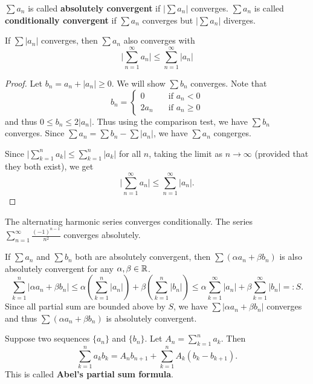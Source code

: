 \documentclass[a4paper]{ctexart}
\begin{document}
    \begin{mydef}
        $\sum a_n$ is called \textbf{absolutely convergent} if $\big|\sum a_n\big|$ converges. $\sum a_n$ is called \textbf{conditionally convergent} if $\sum a_n$ converges but  $\big|\sum a_n\big|$ diverges.
    \end{mydef}
    \begin{mythm}
        If $\sum |a_n|$ converges, then $\sum a_n$ also converges with
        \[
        \Big|\sum_{n=1}^\infty a_n\Big| \le \sum_{n=1}^\infty |a_n|
        \]
    \end{mythm}
    \begin{proof}
        Let $b_n = a_n + |a_n| \ge 0$. We will show $\sum b_n$ converges. Note that
        \[
        b_n = \begin{cases}
            0 \quad & \text{if } a_n < 0\\
            2a_n \quad & \text{if } a_n \ge 0
        \end{cases}
        \]
        and thus $0\le b_n \le 2|a_n|$. Thus using the comparison test, we have $\sum b_n$ converges. Since $\sum a_n = \sum b_n - \sum |a_n|$, we have $\sum a_n$ congerges.

        Since $\displaystyle \Big|\sum_{k=1}^n a_k \Big| \le \sum_{k=1}^n |a_k|$ for all $n$, taking the limit as $n \to \infty$ (provided that they both exist), we get
        \[
        \Big|\sum_{n=1}^\infty a_n\Big| \le \sum_{n=1}^\infty |a_n|.
        \]
    \end{proof}
    \begin{myex}
        The alternating harmonic series converges conditionally. The series $\displaystyle \sum_{n=1}^\infty  \frac{(-1)^{n-1}}{n^2}$ converges absolutely.
    \end{myex}
    \begin{mypro}
        If $\sum a_n$ and $\sum b_n$ both are absolutely convergent, then $\sum (\alpha a_n + \beta b_n)$ is also absolutely convergent for any $\alpha,\beta \in \mathbb{R}$.
        $$ \sum_{k=1}^n|\alpha a_n + \beta b_n| \le \alpha \left( \sum_{k=1}^n |a_n| \right) + \beta \left( \sum_{k=1}^n |b_n| \right) \le \alpha \sum_{k=1}^{\infty} |a_n| + \beta \sum_{k=1}^\infty |b_n| =: S.$$
        Since all partial sum are bounded above by $S$, we have $\sum |\alpha a_n + \beta b_n|$ converges and thus $\sum (\alpha a_n + \beta b_n)$ is absolutely convergent.
    \end{mypro}
    \begin{mylma}
        Suppose two sequences $\{a_n\}$ and $\{b_n\}$. Let $\displaystyle A_n = \sum_{k=1}^n a_k$. Then
        \[
        \sum_{k=1}^{n} a_k b_k = A_n b_{n+1} + \sum_{k=1}^n A_k (b_k - b_{k+1}).
        \]
        This is called \textbf{Abel's partial sum formula}. 
    \end{mylma}
\end{document}
